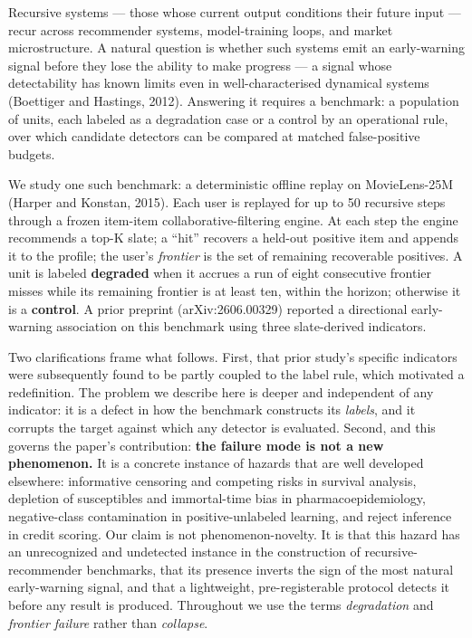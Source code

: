 \documentclass[
  11pt,
]{article}
\begin{document}
Recursive systems --- those whose current output conditions their future
input --- recur across recommender systems, model-training loops, and
market microstructure. A natural question is whether such systems emit
an early-warning signal before they lose the ability to make progress
--- a signal whose detectability has known limits even in
well-characterised dynamical systems (Boettiger and Hastings, 2012).
Answering it requires a benchmark: a population of units, each labeled
as a degradation case or a control by an operational rule, over which
candidate detectors can be compared at matched false-positive budgets.

We study one such benchmark: a deterministic offline replay on
MovieLens-25M (Harper and Konstan, 2015). Each user is replayed for up
to 50 recursive steps through a frozen item-item collaborative-filtering
engine. At each step the engine recommends a top-K slate; a ``hit''
recovers a held-out positive item and appends it to the profile; the
user's \emph{frontier} is the set of remaining recoverable positives. A
unit is labeled \textbf{degraded} when it accrues a run of eight
consecutive frontier misses while its remaining frontier is at least
ten, within the horizon; otherwise it is a \textbf{control}. A prior
preprint (arXiv:2606.00329) reported a directional early-warning
association on this benchmark using three slate-derived indicators.

Two clarifications frame what follows. First, that prior study's
specific indicators were subsequently found to be partly coupled to the
label rule, which motivated a redefinition. The problem we describe here
is deeper and independent of any indicator: it is a defect in how the
benchmark constructs its \emph{labels}, and it corrupts the target
against which any detector is evaluated. Second, and this governs the
paper's contribution: \textbf{the failure mode is not a new phenomenon.}
It is a concrete instance of hazards that are well developed elsewhere:
informative censoring and competing risks in survival analysis,
depletion of susceptibles and immortal-time bias in
pharmacoepidemiology, negative-class contamination in positive-unlabeled
learning, and reject inference in credit scoring. Our claim is not
phenomenon-novelty. It is that this hazard has an unrecognized and
undetected instance in the construction of recursive-recommender
benchmarks, that its presence inverts the sign of the most natural
early-warning signal, and that a lightweight, pre-registerable protocol
detects it before any result is produced. Throughout we use the terms
\emph{degradation} and \emph{frontier failure} rather than
\emph{collapse}.
\end{document}
